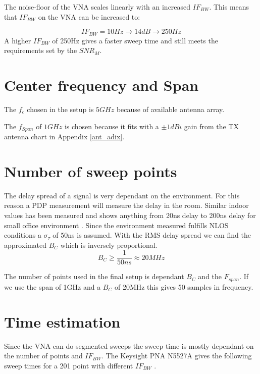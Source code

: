 The noise-floor of the \gls{VNA} scales linearly with an increased $IF_{BW}$\citep{PNA_scale}. This means that $IF_{BW}$ on the \gls{VNA} can be increased to:

\begin{equation}
IF_{BW} = 10Hz \rightarrow 14dB \rightarrow 250Hz
\end{equation}
A higher $IF_{BW}$ of 250Hz  gives a faster sweep time and still meets the requirements set by the $SNR_M$.

\section{Center frequency and Span}
The $f_{c}$ chosen in the setup is $5GHz$ because of available antenna array.

The $f_{Span}$ of $1GHz$ is chosen because it fits with a $\pm 1dBi$ gain from the TX antenna chart in Appendix \ref{ant_adix}.

\section{Number of sweep points}
The delay spread of a signal is very dependant on the environment. For this reason a PDP measurement will measure the delay in the room. Similar indoor values has been measured and shows anything from 20ns delay to 200ns delay for small office environment \citep{indoor_delay}. Since the environment measured fulfills NLOS conditions a $\sigma_{\tau}$ of 50ns is assumed. With the RMS delay spread we can find the approximated $B_C$ which is inversely proportional. 
\begin{equation}
B_C \geq \frac{1}{50ns} \approx 20MHz
\label{CohBW1}
\end{equation}

The number of points used in the final setup is dependant $B_C$ and the $F_{span}$. If we use the span of 1GHz and a $B_C$ of 20MHz this gives 50 samples in frequency.

\section{Time estimation}
\label{TIME_EST}
Since the \gls{VNA} can do segmented sweeps the sweep time is mostly dependant on the number of points and $IF_{BW}$.
The Keysight PNA N5527A gives the following sweep times for a 201 point with different $IF_{BW}$ \citep{Key_PNA}. \\

